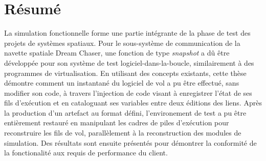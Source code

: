 \chapter*{Résumé}\label{cha:resume}
La simulation fonctionnelle forme une partie intégrante de la phase de test des projets de systèmes spatiaux. Pour le sous-système de communication de la navette spatiale Dream Chaser, une fonction de type \textit{snapshot} a dû être développée pour son système de test logiciel-dans-la-boucle, similairement à des programmes de virtualisation. En utilisant des concepts existants, cette thèse démontre comment un instantané du logiciel de vol a pu être effectué, sans modifier son code, à travers l'injection de code visant à enregistrer l'état de ses fils d'exécution et en cataloguant ses variables entre deux éditions des liens. Après la production d'un artefact au format défini, l'environement de test a pu être entièrement restauré en manipulant les cadres de piles d'exécution pour reconstruire les fils de vol, parallèlement à la reconstruction des modules de simulation. Des résultats sont ensuite présentés pour démontrer la conformité de la fonctionalité aux requis de performance du client.